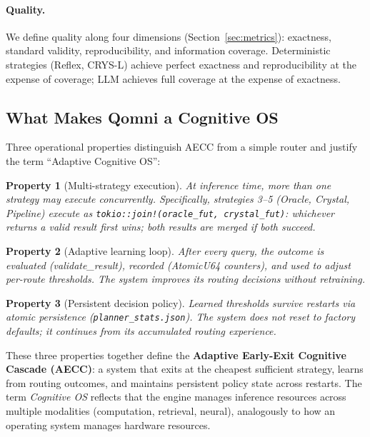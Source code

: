 \documentclass[12pt,a4paper]{article}
\newtheorem{property}{Property}
\begin{document}
\paragraph{Quality.} We define quality along four dimensions (Section~\ref{sec:metrics}):
exactness, standard validity, reproducibility, and information coverage.
Deterministic strategies (Reflex, CRYS-L) achieve perfect exactness and
reproducibility at the expense of coverage; LLM achieves full coverage at
the expense of exactness.

\subsection{What Makes Qomni a Cognitive OS}

Three operational properties distinguish AECC from a simple router
and justify the term ``Adaptive Cognitive OS'':

\begin{property}[Multi-strategy execution]
At inference time, more than one strategy may execute concurrently.
Specifically, strategies 3--5 (Oracle, Crystal, Pipeline) execute as
\texttt{tokio::join!(oracle\_fut, crystal\_fut)}: whichever returns a valid
result first wins; both results are merged if both succeed.
\end{property}

\begin{property}[Adaptive learning loop]
After every query, the outcome is evaluated (validate\_result), recorded
(AtomicU64 counters), and used to adjust per-route thresholds.
The system improves its routing decisions without retraining.
\end{property}

\begin{property}[Persistent decision policy]
Learned thresholds survive restarts via atomic persistence
(\texttt{planner\_stats.json}). The system does not reset to factory defaults;
it continues from its accumulated routing experience.
\end{property}

These three properties together define the \textbf{Adaptive Early-Exit
Cognitive Cascade (AECC)}: a system that exits at the cheapest sufficient
strategy, learns from routing outcomes, and maintains persistent policy state
across restarts. The term \emph{Cognitive OS} reflects that the engine manages
inference resources across multiple modalities (computation, retrieval, neural),
analogously to how an operating system manages hardware resources.
\end{document}
